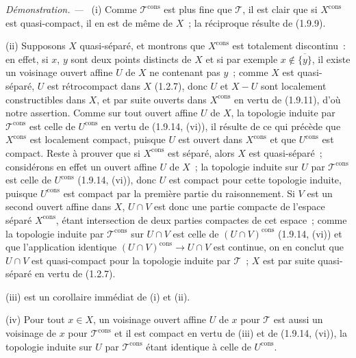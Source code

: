 \documentclass[10pt,oneside]{book}
\newcommand{\oldpage}[2][]{%
  \setcounter{footnote}{0}%
  \marginpar{\scriptsize\textbf{#1}~|~#2}\ignorespaces}
\newenvironment{proof}{%
  \par\medskip\noindent\textit{Démonstration. ---\ }}{\par}
\begin{document}
\begin{proof}
(i) Comme $\mathscr T^{\mathrm{cons}}$ est plus fine que $\mathscr T$, il est
clair que si $X^{\mathrm{cons}}$ est quasi-compact, il en est de même de $X$~;
la réciproque résulte de (1.9.9).

(ii) Supposons $X$ quasi-séparé, et montrons que $X^{\mathrm{cons}}$ est
totalement discontinu~: en effet, si $x$, $y$ sont deux points distincts de
$X$ et si par exemple $x\notin\overline{\{y\}}$, il existe un
\oldpage[IV-1]{248}
voisinage ouvert affine $U$ de $X$ ne contenant pas $y$~; comme $X$ est
quasi-séparé, $U$ est rétrocompact dans $X$ (1.2.7), donc $U$ et $X-U$ sont
localement constructibles dans $X$, et par suite ouverts dans
$X^{\mathrm{cons}}$ en vertu de (1.9.11), d'où notre assertion. Comme sur tout
ouvert affine $U$ de $X$, la topologie induite par $\mathscr T^{\mathrm{cons}}$
est celle de $U^{\mathrm{cons}}$ en vertu de (1.9.14, (vi)), il résulte de ce
qui précède que $X^{\mathrm{cons}}$ est localement compact, puisque $U$ est
ouvert dans $X^{\mathrm{cons}}$ et que $U^{\mathrm{cons}}$ est compact. Reste à
prouver que si $X^{\mathrm{cons}}$ est séparé, alors $X$ est quasi-séparé~;
considérons en effet un ouvert affine $U$ de $X$~; la topologie induite sur
$U$ par $\mathscr T^{\mathrm{cons}}$ est celle de $U^{\mathrm{cons}}$
(1.9.14, (vi)), donc $U$ est compact pour cette topologie induite, puisque
$U^{\mathrm{cons}}$ est compact par la première partie du raisonnement. Si
$V$ est un second ouvert affine dans $X$, $U\cap V$ est donc une partie
compacte de l'espace séparé $X^{\mathrm{cons}}$, étant intersection de deux
parties compactes de cet espace~; comme la topologie induite par
$\mathscr T^{\mathrm{cons}}$ sur $U\cap V$ est celle de
$(U\cap V)^{\mathrm{cons}}$ (1.9.14, (vi)) et que l'application identique
$(U\cap V)^{\mathrm{cons}}\to U\cap V$ est continue, on en conclut que
$U\cap V$ est quasi-compact pour la topologie induite par $\mathscr T$~; $X$
est par suite quasi-séparé en vertu de (1.2.7).

(iii) est un corollaire immédiat de (i) et (ii).

(iv) Pour tout $x\in X$, un voisinage ouvert affine $U$ de $x$ pour
$\mathscr T$ est aussi un voisinage de $x$ pour $\mathscr T^{\mathrm{cons}}$
et il est compact en vertu de (iii) et de (1.9.14, (vi)), la topologie induite
sur $U$ par $\mathscr T^{\mathrm{cons}}$ étant identique à celle de
$U^{\mathrm{cons}}$.


\end{proof}
\end{document}
